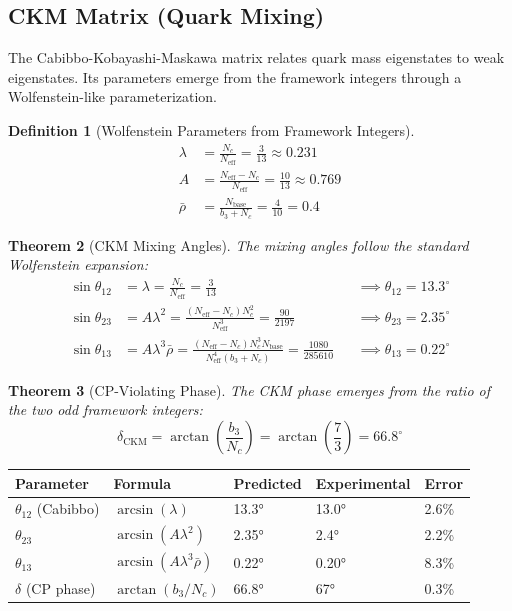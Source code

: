 \documentclass[11pt,a4paper]{article}
\newtheorem{theorem}{Theorem}[section]
\theoremstyle{definition}
\newtheorem{definition}[theorem]{Definition}
\theoremstyle{remark}
\newcommand{\Neff}{N_{\text{eff}}}
\begin{document}
\subsection{CKM Matrix (Quark Mixing)}

The Cabibbo-Kobayashi-Maskawa matrix relates quark mass eigenstates to weak eigenstates. Its parameters emerge from the framework integers through a Wolfenstein-like parameterization.

\begin{definition}[Wolfenstein Parameters from Framework Integers]
\begin{align}
\lambda &= \frac{N_c}{\Neff} = \frac{3}{13} \approx 0.231 \\
A &= \frac{\Neff - N_c}{\Neff} = \frac{10}{13} \approx 0.769 \\
\bar{\rho} &= \frac{N_{\text{base}}}{b_3 + N_c} = \frac{4}{10} = 0.4
\end{align}
\end{definition}

\begin{theorem}[CKM Mixing Angles]
The mixing angles follow the standard Wolfenstein expansion:
\begin{align}
\sin\theta_{12} &= \lambda = \frac{N_c}{\Neff} = \frac{3}{13} && \implies \theta_{12} = 13.3^\circ \\
\sin\theta_{23} &= A\lambda^2 = \frac{(\Neff - N_c) N_c^2}{\Neff^3} = \frac{90}{2197} && \implies \theta_{23} = 2.35^\circ \\
\sin\theta_{13} &= A\lambda^3\bar{\rho} = \frac{(\Neff - N_c) N_c^3 N_{\text{base}}}{\Neff^4 (b_3 + N_c)} = \frac{1080}{285610} && \implies \theta_{13} = 0.22^\circ
\end{align}
\end{theorem}

\begin{theorem}[CP-Violating Phase]
The CKM phase emerges from the ratio of the two odd framework integers:
\begin{equation}
\delta_{\text{CKM}} = \arctan\left(\frac{b_3}{N_c}\right) = \arctan\left(\frac{7}{3}\right) = 66.8^\circ
\end{equation}
\end{theorem}

\begin{center}
\begin{tabular}{lllll}
\toprule
Parameter & Formula & Predicted & Experimental & Error \\
\midrule
$\theta_{12}$ (Cabibbo) & $\arcsin(\lambda)$ & 13.3° & 13.0° & 2.6\% \\
$\theta_{23}$ & $\arcsin(A\lambda^2)$ & 2.35° & 2.4° & 2.2\% \\
$\theta_{13}$ & $\arcsin(A\lambda^3\bar{\rho})$ & 0.22° & 0.20° & 8.3\% \\
$\delta$ (CP phase) & $\arctan(b_3/N_c)$ & 66.8° & 67° & 0.3\% \\
\bottomrule
\end{tabular}
\end{center}
\end{document}
